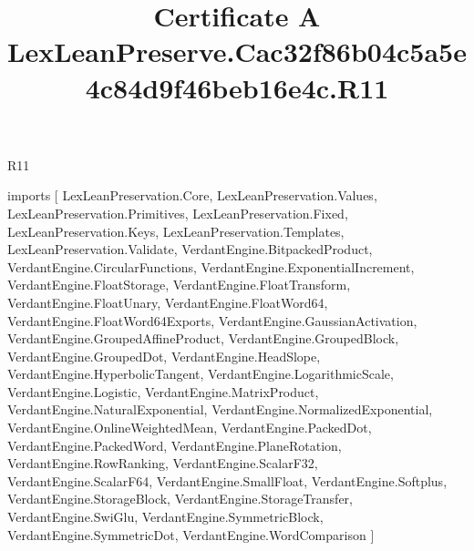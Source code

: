 \begin{lexlean}{R11}
\title{Certificate A LexLeanPreserve.Cac32f86b04c5a5e4c84d9f46beb16e4c.R11}
\begin{coremodule}
imports [
  LexLeanPreservation.Core,
  LexLeanPreservation.Values,
  LexLeanPreservation.Primitives,
  LexLeanPreservation.Fixed,
  LexLeanPreservation.Keys,
  LexLeanPreservation.Templates,
  LexLeanPreservation.Validate,
  VerdantEngine.BitpackedProduct,
  VerdantEngine.CircularFunctions,
  VerdantEngine.ExponentialIncrement,
  VerdantEngine.FloatStorage,
  VerdantEngine.FloatTransform,
  VerdantEngine.FloatUnary,
  VerdantEngine.FloatWord64,
  VerdantEngine.FloatWord64Exports,
  VerdantEngine.GaussianActivation,
  VerdantEngine.GroupedAffineProduct,
  VerdantEngine.GroupedBlock,
  VerdantEngine.GroupedDot,
  VerdantEngine.HeadSlope,
  VerdantEngine.HyperbolicTangent,
  VerdantEngine.LogarithmicScale,
  VerdantEngine.Logistic,
  VerdantEngine.MatrixProduct,
  VerdantEngine.NaturalExponential,
  VerdantEngine.NormalizedExponential,
  VerdantEngine.OnlineWeightedMean,
  VerdantEngine.PackedDot,
  VerdantEngine.PackedWord,
  VerdantEngine.PlaneRotation,
  VerdantEngine.RowRanking,
  VerdantEngine.ScalarF32,
  VerdantEngine.ScalarF64,
  VerdantEngine.SmallFloat,
  VerdantEngine.Softplus,
  VerdantEngine.StorageBlock,
  VerdantEngine.StorageTransfer,
  VerdantEngine.SwiGlu,
  VerdantEngine.SymmetricBlock,
  VerdantEngine.SymmetricDot,
  VerdantEngine.WordComparison
]


\end{coremodule}
\end{lexlean}
